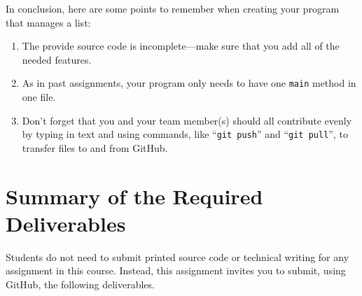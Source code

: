 \documentclass[11pt]{article}
\newcommand{\command}[1]{``\lstinline{#1}''}
\begin{document}
\noindent
In conclusion, here are some points to remember when creating your program that manages a list:

\begin{enumerate}
  \setlength{\itemsep}{0pt}

\item The provide source code is incomplete---make sure that you add all of the needed features.

\item As in past assignments, your program only needs to have one {\tt main} method in one file.

\item Don't forget that you and your team member(s) should all contribute evenly by typing in text and using commands,
  like \command{git push} and \command{git pull}, to transfer files to and from GitHub.

\end{enumerate}

\section*{Summary of the Required Deliverables}

\noindent Students do not need to submit printed source code or technical writing for any assignment in this course.
Instead, this assignment invites you to submit, using GitHub, the following deliverables.
\end{document}
